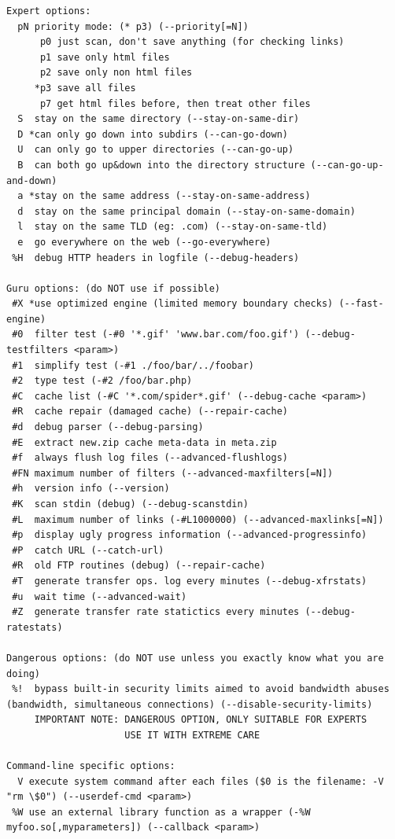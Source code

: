 \documentclass{article}
\begin{document}
\begin{lstlisting}
Expert options:
  pN priority mode: (* p3) (--priority[=N])
      p0 just scan, don't save anything (for checking links)
      p1 save only html files
      p2 save only non html files
     *p3 save all files
      p7 get html files before, then treat other files
  S  stay on the same directory (--stay-on-same-dir)
  D *can only go down into subdirs (--can-go-down)
  U  can only go to upper directories (--can-go-up)
  B  can both go up&down into the directory structure (--can-go-up-and-down)
  a *stay on the same address (--stay-on-same-address)
  d  stay on the same principal domain (--stay-on-same-domain)
  l  stay on the same TLD (eg: .com) (--stay-on-same-tld)
  e  go everywhere on the web (--go-everywhere)
 %H  debug HTTP headers in logfile (--debug-headers)

Guru options: (do NOT use if possible)
 #X *use optimized engine (limited memory boundary checks) (--fast-engine)
 #0  filter test (-#0 '*.gif' 'www.bar.com/foo.gif') (--debug-testfilters <param>)
 #1  simplify test (-#1 ./foo/bar/../foobar)
 #2  type test (-#2 /foo/bar.php)
 #C  cache list (-#C '*.com/spider*.gif' (--debug-cache <param>)
 #R  cache repair (damaged cache) (--repair-cache)
 #d  debug parser (--debug-parsing)
 #E  extract new.zip cache meta-data in meta.zip
 #f  always flush log files (--advanced-flushlogs)
 #FN maximum number of filters (--advanced-maxfilters[=N])
 #h  version info (--version)
 #K  scan stdin (debug) (--debug-scanstdin)
 #L  maximum number of links (-#L1000000) (--advanced-maxlinks[=N])
 #p  display ugly progress information (--advanced-progressinfo)
 #P  catch URL (--catch-url)
 #R  old FTP routines (debug) (--repair-cache)
 #T  generate transfer ops. log every minutes (--debug-xfrstats)
 #u  wait time (--advanced-wait)
 #Z  generate transfer rate statictics every minutes (--debug-ratestats)

Dangerous options: (do NOT use unless you exactly know what you are doing)
 %!  bypass built-in security limits aimed to avoid bandwidth abuses (bandwidth, simultaneous connections) (--disable-security-limits)
     IMPORTANT NOTE: DANGEROUS OPTION, ONLY SUITABLE FOR EXPERTS
                     USE IT WITH EXTREME CARE

Command-line specific options:
  V execute system command after each files ($0 is the filename: -V "rm \$0") (--userdef-cmd <param>)
 %W use an external library function as a wrapper (-%W myfoo.so[,myparameters]) (--callback <param>)


\end{lstlisting}
\end{document}
